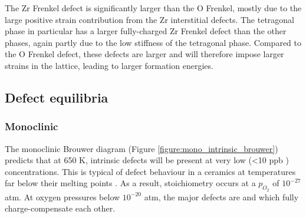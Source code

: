 The Zr Frenkel defect is significantly larger than the O Frenkel, mostly due to the large positive strain contribution from the Zr interstitial defects. The tetragonal phase in particular has a larger fully-charged Zr Frenkel defect than the other phases, again partly due to the low stiffness of the tetragonal phase. Compared to the O Frenkel defect, these defects are larger and will therefore impose larger strains in the lattice, leading to larger formation energies. 

\subsection{Defect equilibria} \label{brouwer_discussion_intrinsic}

\subsubsection*{Monoclinic}

The monoclinic Brouwer diagram (Figure \ref{figure:mono_intrinsic_brouwer}) predicts that at 650 K, intrinsic defects will be present at very low (\textless 10 ppb \zirconia ) concentrations. This is typical of defect behaviour in a ceramics at temperatures far below their melting points \cite{kingery1997physical,ball2006computer}. As a result, stoichiometry occurs at a $p_{O_{2}}$ of $10^{-27}$ atm. At oxygen pressures below $10^{-20}$ atm, the major defects are  and  which fully charge-compensate each other. 

